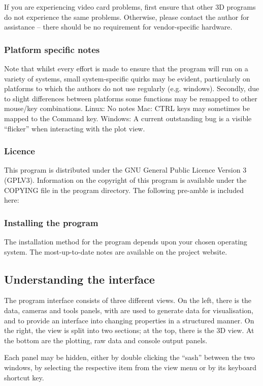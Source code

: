 \documentclass[10pt]{article}
\begin{document}
If you are experiencing video card problems, first ensure that other 3D programs do not experience the same problems. Otherwise, please contact the author for assistance -- there should be no requirement for vendor-specific hardware. 

\subsubsection{Platform specific notes}
Note that whilst every effort is made to ensure that the program will run on a variety of systems, small system-specific quirks may be evident, particularly on platforms to which the authors do not use regularly (e.g. windows). Secondly, due to slight differences between platforms some functions may be remapped to other mouse/key combinations.  
Linux: No notes Mac: CTRL keys may sometimes be mapped to the Command key. Windows: A current outstanding bug is a visible ``flicker'' when interacting with the plot view.  
\subsubsection{Licence}
This program is distributed under the GNU General Public Licence Version 3 (GPLV3). Information on the copyright of this program is available under the COPYING file in the program directory. The following pre-amble is included here:  
 
\subsubsection{Installing the program}
The installation method for the program depends upon your chosen operating system. The most-up-to-date notes are available on the project website.  

\subsection{Understanding the interface}

The program interface consists of three different views. On the left, there is the data, cameras and tools panels, with are used to generate data for visualisation, and to provide an interface into changing properties in a structured manner. On the right, the view is split into two sections; at the top, there is the 3D view. At the bottom are the plotting, raw data and console output panels.  

Each panel may be hidden, either by double clicking the ``sash'' between the two windows, by selecting the respective item from the view menu or by its keyboard shortcut key.  
\end{document}

